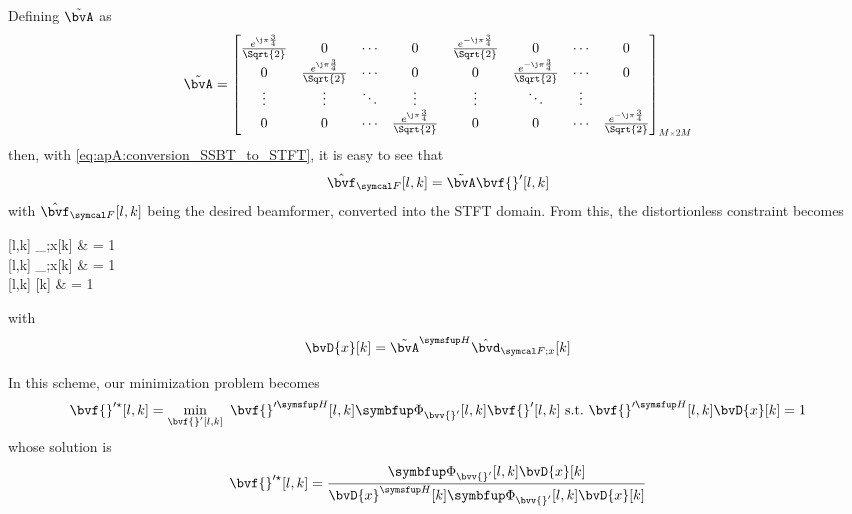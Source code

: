 Defining $\tilde{\bvA}$ as
\begin{equation}
	\tilde{\bvA} = \begin{bmatrix}
		\frac{e^{\j\pi\frac{3}{4}}}{\Sqrt{2}} & 0 & \cdots & 0  & \frac{e^{-\j\pi\frac{3}{4}}}{\Sqrt{2}} & 0 & \cdots & 0\\
		0 & \frac{e^{\j\pi\frac{3}{4}}}{\Sqrt{2}} & \cdots & 0  & 0 & \frac{e^{-\j\pi\frac{3}{4}}}{\Sqrt{2}} & \cdots & 0\\
		\vdots & \vdots & \ddots & \vdots & \vdots & \ddots & \vdots  \\
		0 & 0 & \cdots & \frac{e^{\j\pi\frac{3}{4}}}{\Sqrt{2}} & 0 & 0 & \cdots & \frac{e^{-\j\pi\frac{3}{4}}}{\Sqrt{2}}
	\end{bmatrix}\SubSize{M}{2M}
\end{equation}
then, with \cref{eq:apA:conversion_SSBT_to_STFT}, it is easy to see that
\begin{equation}
	\hat{\bvf}_{\F}[l,k] = \tilde{\bvA} \bvf{}'[l,k]
\end{equation}
with $\hat{\bvf}_{\F}[l,k]$ being the desired beamformer, converted into the STFT domain. From this, the distortionless constraint becomes
\begin{equations}
	\he{\hat{\bvf}_{\F}}[l,k] \hat{\bvd}_{\F;x}[k] & = 1 \\
	[l,k] \he{\tilde{\bvA}} \hat{\bvd}_{\F;x}[k] & = 1 \\
	[l,k]  & = 1
\end{equations}
with
\begin{equation}
	\bvD{x}[k] = \he{\tilde{\bvA}} \hat{\bvd}_{\F;x}[k]
\end{equation}

In this scheme, our minimization problem becomes
\begin{equation}
	\label{eq:sec4:minimization_true_mvdr_ssbt}
	\bvf{}'^\star[l,k] = \min_{\bvf{}'[l,k]}~ \he{\bvf{}'}[l,k] \Corr{\bvv{}'}[l,k] \bvf{}'[l,k]~\text{s.t.}~\he{\bvf{}'}[l,k] \bvD{x}[k] = 1
\end{equation}
whose solution is
\begin{equation}
	\bvf{}'^\star[l,k] = \frac{ \Corr{\bvv{}'}[l,k] \bvD{x}[k] }{ \he{\bvD{x}}[k] \Corr{\bvv{}'}[l,k] \bvD{x}[k] }
\end{equation}

